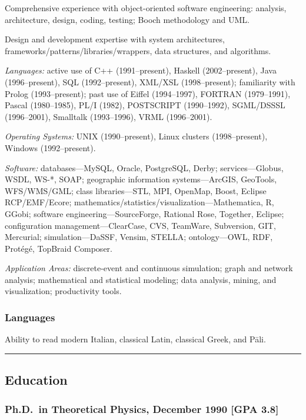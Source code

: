 \documentclass[]{article}
\begin{document}
Comprehensive experience with object-oriented software engineering:
analysis, architecture, design, coding, testing; Booch methodology and
UML.

Design and development expertise with system architectures,
frameworks/patterns/libraries/wrappers, data structures, and algorithms.

\emph{Languages:} active use of C++ (1991--present), Haskell
(2002--present), Java (1996--present), SQL (1992--present), XML/XSL
(1998--present); familiarity with Prolog (1993--present); past use of
Eiffel (1994--1997), FORTRAN (1979--1991), Pascal (1980--1985), PL/I
(1982), POSTSCRIPT (1990--1992), SGML/DSSSL (1996--2001), Smalltalk
(1993--1996), VRML (1996--2001).

\emph{Operating Systems:} UNIX (1990--present), Linux clusters
(1998--present), Windows (1992--present).

\emph{Software:} databases---MySQL, Oracle, PostgreSQL, Derby;
services---Globus, WSDL, WS-*, SOAP; geographic information
systems---ArcGIS, GeoTools, WFS/WMS/GML; class libraries---STL, MPI,
OpenMap, Boost, Eclipse RCP/EMF/Ecore;
mathematics/statistics/visualization---Mathematica, R, GGobi; software
engineering---SourceForge, Rational Rose, Together, Eclipse;
configuration management---ClearCase, CVS, TeamWare, Subversion, GIT,
Mercurial; simulation---DaSSF, Vensim, STELLA; ontology---OWL, RDF,
Protégé, TopBraid Composer.

\emph{Application Areas:} discrete-event and continuous simulation;
graph and network analysis; mathematical and statistical modeling; data
analysis, mining, and visualization; productivity tools.

\subsubsection{Languages}\label{languages}

Ability to read modern Italian, classical Latin, classical Greek, and
Pāli.

\begin{center}\rule{3in}{0.4pt}\end{center}

\subsection{Education}\label{education}

\subsubsection{Ph.D.~in Theoretical Physics, December 1990 {[}GPA
3.8{]}}\label{ph.d.in-theoretical-physics-december-1990-gpa-3.8}
\end{document}
